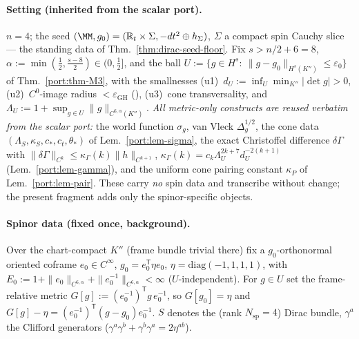 \paragraph{Setting (inherited from the scalar port).} $n=4$; the seed
$(\MM,g_0)=(\mathbb R_t\times\Sigma,-dt^2\oplus h_\Sigma)$, $\Sigma$ a compact
spin Cauchy slice --- the standing data of Thm.~\ref{thm:dirac-seed-floor}.
Fix $s>n/2+6=8$, $\alpha:=\min(\tfrac12,\tfrac{s-8}2)\in(0,\tfrac12]$, and the
ball $U:=\{g\in H^s:\ \|g-g_0\|_{H^s(K'')}\le\varepsilon_0\}$ of
Thm.~\ref{port:thm-M3}, with the smallnesses (u1)~$d_U:=\inf_U\min_{K''}
|\det g|>0$, (u2)~$C^0$-image radius $<\varepsilon_{\mathrm{GH}}$
(\cite{ChruscielGrant2012}), (u3)~cone transversality, and
$\Lambda_U:=1+\sup_{g\in U}\|g\|_{C^{6,\alpha}(K'')}$. \emph{All metric-only
constructs are reused verbatim from the scalar port:} the world function
$\sigma_g$, van Vleck $\Delta^{1/2}_g$, the cone data $(\Lambda_S,\kappa_S,
c_*,c_t,\theta_*)$ of Lem.~\ref{port:lem-sigma}, the exact Christoffel
difference $\delta\Gamma$ with $\|\delta\Gamma\|_{C^k}\le\kappa_\Gamma(k)
\|h\|_{C^{k+1}}$, $\kappa_\Gamma(k)=c_k\Lambda_U^{2k+7}d_U^{-2(k+1)}$
(Lem.~\ref{port:lem-gamma}), and the uniform cone pairing constant $\kappa_P$
of Lem.~\ref{port:lem-pair}. These carry \emph{no} spin data and transcribe
without change; the present fragment adds only the spinor-specific objects.

\paragraph{Spinor data (fixed once, background).} Over the chart-compact
$K''$ (frame bundle trivial there) fix a $g_0$-orthonormal oriented coframe
$e_0\in C^\infty$, $g_0=e_0^{\mathsf T}\eta e_0$, $\eta=\mathrm{diag}(-1,1,1,1)$,
with $E_0:=1+\|e_0\|_{C^{6,\alpha}}+\|e_0^{-1}\|_{C^{6,\alpha}}<\infty$
($U$-independent). For $g\in U$ set the frame-relative metric
$G[g]:=(e_0^{-1})^{\mathsf T}g\,e_0^{-1}$, so $G[g_0]=\eta$ and
$G[g]-\eta=(e_0^{-1})^{\mathsf T}(g-g_0)e_0^{-1}$. $S$ denotes the (rank
$N_{\mathrm{sp}}=4$) Dirac bundle, $\gamma^a$ the Clifford generators
($\gamma^a\gamma^b+\gamma^b\gamma^a=2\eta^{ab}$).

